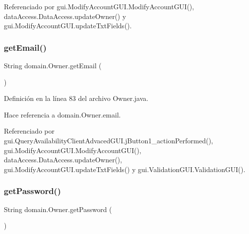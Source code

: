 Referenciado por gui.\+Modify\+Account\+G\+U\+I.\+Modify\+Account\+G\+U\+I(), data\+Access.\+Data\+Access.\+update\+Owner() y gui.\+Modify\+Account\+G\+U\+I.\+update\+Txt\+Fields().

\mbox{\label{classdomain_1_1_owner_afb08255ba011740f10d8dfe35b8168bb}} 
\subsubsection{\texorpdfstring{getEmail()}{getEmail()}}
{\footnotesize\ttfamily String domain.\+Owner.\+get\+Email (\begin{DoxyParamCaption}{ }\end{DoxyParamCaption})}



Definición en la línea 83 del archivo Owner.\+java.


\begin{DoxyCode}{0}

\end{DoxyCode}


Hace referencia a domain.\+Owner.\+email.



Referenciado por gui.\+Query\+Availability\+Client\+Advaced\+G\+U\+I.\+j\+Button1\+\_\+action\+Performed(), gui.\+Modify\+Account\+G\+U\+I.\+Modify\+Account\+G\+U\+I(), data\+Access.\+Data\+Access.\+update\+Owner(), gui.\+Modify\+Account\+G\+U\+I.\+update\+Txt\+Fields() y gui.\+Validation\+G\+U\+I.\+Validation\+G\+U\+I().

\mbox{\label{classdomain_1_1_owner_a111db748c1d8f6451efb9486566b2df5}} 
\subsubsection{\texorpdfstring{getPassword()}{getPassword()}}
{\footnotesize\ttfamily String domain.\+Owner.\+get\+Password (\begin{DoxyParamCaption}{ }\end{DoxyParamCaption})}




